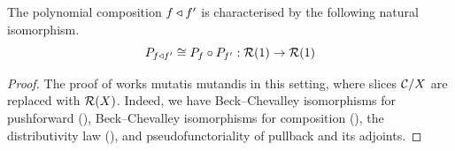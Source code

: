 \begin{lemma}
  The polynomial composition ${f \triangleleft f'}$
  is characterised by the following natural isomorphism.
  \[ P_{f \triangleleft f'} \cong P_{f} \circ P_{f'} : \mathcal{R}(1) \to \mathcal{R}(1) \]
\end{lemma}
\begin{proof}
  The proof of \cite[Proposition 1.12]{gambino2013}
  works mutatis mutandis in this setting,
  where slices $\mathcal{C} / X$ are replaced with $\mathcal{R}(X)$.
  Indeed, we have Beck--Chevalley isomorphisms for pushforward
  (),
  Beck--Chevalley isomorphisms for composition
  (),
  the distributivity law (),
  and pseudofunctoriality of pullback and its adjoints. 
  
\end{proof}

